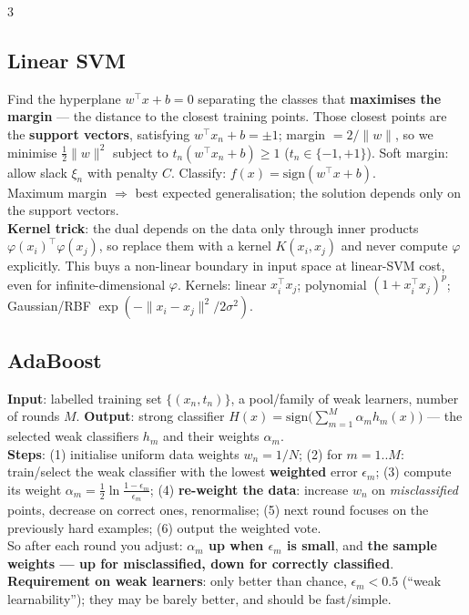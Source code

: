 \documentclass[9pt,a4paper,landscape]{extarticle}
\newcommand{\key}[1]{\textbf{#1}}
\begin{document}
\begin{multicols}{3}
\subsection{Linear SVM}
Find the hyperplane $w^\top x+b=0$ separating the classes that \key{maximises the margin} --- the distance to the closest training points. Those closest points are the \key{support vectors}, satisfying $w^\top x_n+b=\pm1$; margin $=2/\|w\|$, so we minimise $\tfrac12\|w\|^2$ subject to $t_n(w^\top x_n+b)\ge1$ ($t_n\in\{-1,+1\}$). Soft margin: allow slack $\xi_n$ with penalty $C$. Classify: $f(x)=\mathrm{sign}(w^\top x+b)$.\\
Maximum margin $\Rightarrow$ best expected generalisation; the solution depends only on the support vectors.\\
\key{Kernel trick}: the dual depends on the data only through inner products $\varphi(x_i)^\top\varphi(x_j)$, so replace them with a kernel $K(x_i,x_j)$ and never compute $\varphi$ explicitly. This buys a non-linear boundary in input space at linear-SVM cost, even for infinite-dimensional $\varphi$. Kernels: linear $x_i^\top x_j$; polynomial $(1+x_i^\top x_j)^p$; Gaussian/RBF $\exp(-\|x_i-x_j\|^2/2\sigma^2)$.

\subsection{AdaBoost}
\key{Input}: labelled training set $\{(x_n,t_n)\}$, a pool/family of weak learners, number of rounds $M$. \key{Output}: strong classifier $H(x)=\mathrm{sign}\big(\sum_{m=1}^{M}\alpha_m h_m(x)\big)$ --- the selected weak classifiers $h_m$ and their weights $\alpha_m$.\\
\textbf{Steps}: (1) initialise uniform data weights $w_n=1/N$; (2) for $m=1..M$: train/select the weak classifier with the lowest \key{weighted} error $\epsilon_m$; (3) compute its weight $\alpha_m=\tfrac12\ln\frac{1-\epsilon_m}{\epsilon_m}$; (4) \key{re-weight the data}: increase $w_n$ on \emph{misclassified} points, decrease on correct ones, renormalise; (5) next round focuses on the previously hard examples; (6) output the weighted vote.\\
So after each round you adjust: \key{$\alpha_m$ up when $\epsilon_m$ is small}, and \key{the sample weights --- up for misclassified, down for correctly classified}.\\
\key{Requirement on weak learners}: only better than chance, $\epsilon_m<0.5$ (``weak learnability''); they may be barely better, and should be fast/simple.


\end{multicols}
\end{document}
